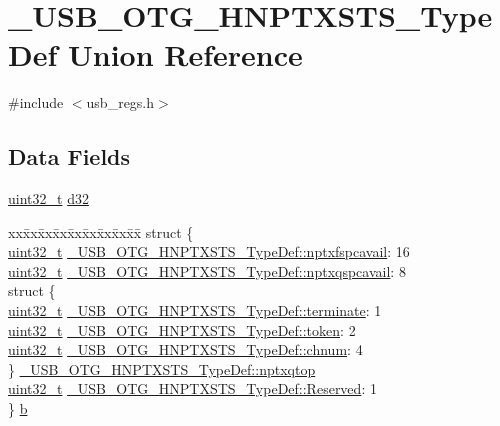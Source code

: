 \hypertarget{union___u_s_b___o_t_g___h_n_p_t_x_s_t_s___type_def}{\section{\-\_\-\-U\-S\-B\-\_\-\-O\-T\-G\-\_\-\-H\-N\-P\-T\-X\-S\-T\-S\-\_\-\-Type\-Def Union Reference}
\label{union___u_s_b___o_t_g___h_n_p_t_x_s_t_s___type_def}
}


{\ttfamily \#include $<$usb\-\_\-regs.\-h$>$}

\subsection*{Data Fields}
\begin{DoxyCompactItemize}
\item 
\hyperlink{stdint_8h_a435d1572bf3f880d55459d9805097f62}{uint32\-\_\-t} \hyperlink{group___u_s_b___o_t_g___d_r_i_v_e_r_ga45ca79f639e05d3ece30649050c81084}{d32}
\item 
\begin{tabbing}
xx\=xx\=xx\=xx\=xx\=xx\=xx\=xx\=xx\=\kill
struct \{\\
\>\hyperlink{stdint_8h_a435d1572bf3f880d55459d9805097f62}{uint32\_t} \hyperlink{group___u_s_b___o_t_g___d_r_i_v_e_r_gac775d30f4d6ea8497522eea1c8f1dd99}{\_USB\_OTG\_HNPTXSTS\_TypeDef::nptxfspcavail}: 16\\
\>\hyperlink{stdint_8h_a435d1572bf3f880d55459d9805097f62}{uint32\_t} \hyperlink{group___u_s_b___o_t_g___d_r_i_v_e_r_gac7c8e3ec8eb043384cd26aaf67009f46}{\_USB\_OTG\_HNPTXSTS\_TypeDef::nptxqspcavail}: 8\\
\>struct \{\\
\>\>\hyperlink{stdint_8h_a435d1572bf3f880d55459d9805097f62}{uint32\_t} \hyperlink{group___u_s_b___o_t_g___d_r_i_v_e_r_ga15d8c9921780fc2eabe7052d5aa94ca1}{\_USB\_OTG\_HNPTXSTS\_TypeDef::terminate}: 1\\
\>\>\hyperlink{stdint_8h_a435d1572bf3f880d55459d9805097f62}{uint32\_t} \hyperlink{group___u_s_b___o_t_g___d_r_i_v_e_r_gae107b5535ca75e09689f2e18a7f0a7d9}{\_USB\_OTG\_HNPTXSTS\_TypeDef::token}: 2\\
\>\>\hyperlink{stdint_8h_a435d1572bf3f880d55459d9805097f62}{uint32\_t} \hyperlink{group___u_s_b___o_t_g___d_r_i_v_e_r_gaa358189a93a955a21e5b3cfdb0b1a08d}{\_USB\_OTG\_HNPTXSTS\_TypeDef::chnum}: 4\\
\>\} \hyperlink{group___u_s_b___o_t_g___d_r_i_v_e_r_gac60267dff234320797a8a09809cc7b43}{\_USB\_OTG\_HNPTXSTS\_TypeDef::nptxqtop}\\
\>\hyperlink{stdint_8h_a435d1572bf3f880d55459d9805097f62}{uint32\_t} \hyperlink{group___u_s_b___o_t_g___d_r_i_v_e_r_ga0b02a3404c6ad41176f49181c017ca7c}{\_USB\_OTG\_HNPTXSTS\_TypeDef::Reserved}: 1\\
\} \hyperlink{group___u_s_b___o_t_g___d_r_i_v_e_r_ga93b03184bf8fd8e9db0d50ef51e02aa3}{b}\\

\end{tabbing}\end{DoxyCompactItemize}


